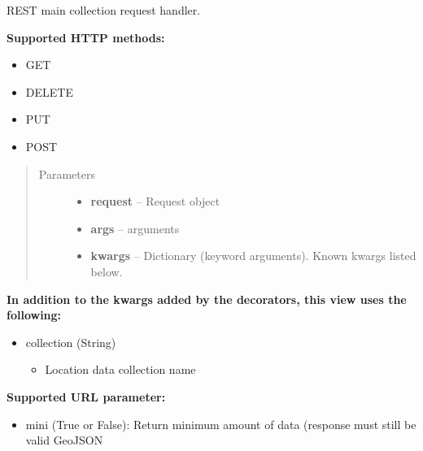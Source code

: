 \documentclass[letterpaper,10pt,english]{sphinxmanual}
\begin{document}
\begin{fulllineitems}
\label{codedoc/locdoc:lbd_backend.LBD_REST_locationdata.views.collection}
REST main collection request handler.

\textbf{Supported HTTP methods:}
\begin{itemize}
\item {} 
GET

\item {} 
DELETE

\item {} 
PUT

\item {} 
POST

\end{itemize}
\begin{quote}\begin{description}
\item[{Parameters}] \leavevmode\begin{itemize}
\item {} 
\textbf{request} -- Request object

\item {} 
\textbf{args} -- arguments

\item {} 
\textbf{kwargs} -- Dictionary (keyword arguments). Known kwargs listed below.

\end{itemize}

\end{description}\end{quote}

\textbf{In addition to the kwargs added by the decorators, this view uses the following:}
\begin{itemize}
\item {} 
collection (String)
\begin{itemize}
\item {} 
Location data collection name

\end{itemize}

\end{itemize}

\textbf{Supported URL parameter:}
\begin{itemize}
\item {} 
mini (True or False): Return minimum amount of data (response must still be valid GeoJSON

\end{itemize}

\end{fulllineitems}
\end{document}
